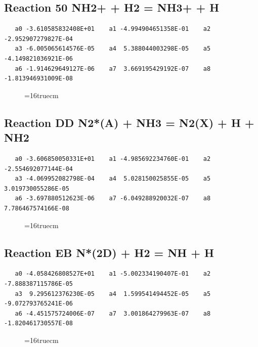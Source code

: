 \documentclass[12pt,dvipdfm]{article}
\begin{document}
\subsection{
Reaction 50 NH2+ + H2 = NH3+ + H}
\begin{small}\begin{verbatim}
   a0 -3.610585832408E+01    a1 -4.994904651358E-01    a2 -2.952907279827E-04
   a3 -6.005065614576E-05    a4  5.388044003298E-05    a5 -4.149821036921E-06
   a6 -1.914629649127E-06    a7  3.669195429192E-07    a8 -1.813946931009E-08
   \end{verbatim}\end{small}
\begin{figure}[h!]
\label{n2rates}
\epsfxsize=16truecm
\end{figure}
\newpage

\subsection{
Reaction DD N2*(A) + NH3 =  N2(X) + H + NH2}
\begin{small}\begin{verbatim}
   a0 -3.606850050331E+01    a1 -4.985692234760E-01    a2 -2.554692077144E-04
   a3 -4.069952082798E-04    a4  5.028150025855E-05    a5  3.019730055286E-05
   a6 -3.697880512623E-06    a7 -6.049288920032E-07    a8  7.786467574166E-08
   \end{verbatim}\end{small}
\begin{figure}[h!]
\label{n2rates}
\epsfxsize=16truecm
\end{figure}
\newpage

\subsection{
Reaction EB N*(2D) + H2  = NH + H}
\begin{small}\begin{verbatim}
   a0 -4.058426808527E+01    a1 -5.002334190407E-01    a2 -7.888387115786E-05
   a3  9.295612376230E-05    a4  1.599541494452E-05    a5 -9.072793765241E-06
   a6 -4.451575724006E-07    a7  3.001864279963E-07    a8 -1.820461730557E-08
   \end{verbatim}\end{small}
\begin{figure}[h!]
\label{n2rates}
\epsfxsize=16truecm
\end{figure}
\newpage
\end{document}
